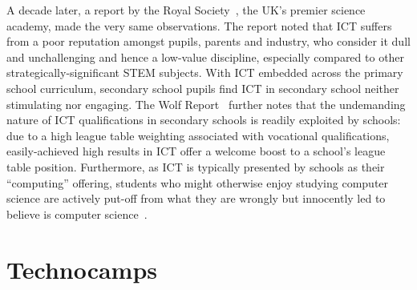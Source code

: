 \documentclass{sig-alternate}
\begin{document}
A decade later, a report by the Royal Society~\cite{RoyalSoc:2012},
the UK's premier science academy, made the very same observations.
The report noted that ICT suffers from a poor reputation amongst
pupils, parents and industry, who consider it dull and unchallenging
and hence a low-value discipline, especially compared to other
strategically-significant STEM subjects.  With ICT embedded across the
primary school curriculum, secondary school pupils find ICT in
secondary school neither stimulating nor engaging. The Wolf
Report~\cite{Wolf:2011} further notes that the undemanding nature of
ICT qualifications in secondary schools is readily exploited by schools:
due to a high league table weighting associated with
vocational qualifications, easily-achieved high results in ICT offer a
welcome boost to a school's league table position. Furthermore, as ICT
is typically presented by schools as their ``computing'' offering,
students who might otherwise enjoy studying computer science are
actively put-off from what they are wrongly but innocently
led to believe is computer
science~\cite{crick+sentance:2011,brown-et-al-sigcse2012}.

\section{Technocamps}\label{technocamps}

\end{document}
